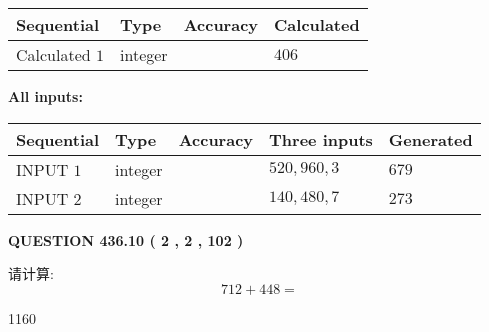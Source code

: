 \documentclass{ctexart}
\begin{document}
   
   
   
\noindent{}
   
   
  
  
\noindent\begin{tabular}{|l|l|l|l|}
\hline
 Sequential & Type & Accuracy & Calculated \\ 
\hline
 
 
  Calculated $  1 $ & integer &  & 
  $ 406 $ 
 \\  \hline  
 \end{tabular}
   
   
   
   
\noindent\vspace{0.1in}\hspace{-0.08in} {\textbf{\Large{All inputs: }}}
   
   
  
  
\noindent\begin{tabular}{|l|l|l|l|l|}
\hline
 Sequential & Type & Accuracy & Three inputs & Generated \\ 
\hline
 
 
  INPUT $  1 $ & integer &  & $
 520
 , 
 960
 , 
 3
 $ & $ 679 $ 
 \\  \hline  
 
 
  INPUT $  2 $ & integer &  & $
 140
 , 
 480
 , 
 7
 $ & $ 273 $ 
 \\  \hline  
 \end{tabular}
   
   
  
\vspace{0.2in}
  
{\textbf{\Large{QUESTION
436.10 
 ( 2 , 2 , 102 )
}}}
  
  
 
请计算:
\begin{equation}
712 +  %
448 = \nonumber
\end{equation}
 
 
 
\noindent{}
 
 

1160
 
 
\noindent{}
 
 

 
 
 
\noindent{}
 
\end{document}
